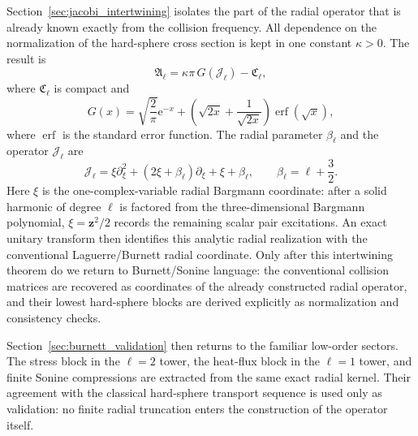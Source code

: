 \documentclass[11pt]{article}
\numberwithin{equation}{section}
\newcommand{\e}{\mathrm e}
\theoremstyle{definition}
\begin{document}
Section~\ref{sec:jacobi_intertwining} isolates the part of the radial operator that is already known
exactly from the collision frequency.  All dependence on the normalization
of the hard-sphere cross section is kept in one constant $\kappa>0$.  The
result is
\begin{equation}
 \boxed{
 \mathfrak A_\ell
 =
 \kappa\pi\,G(\mathcal J_\ell)-\mathfrak C_\ell,
 }
 \label{eq:intro_main_operator}
\end{equation}
where $\mathfrak C_\ell$ is compact and
\begin{equation}
 G(x)
 =
 \sqrt{\frac2\pi}\e^{-x}
 +
 \left(\sqrt{2x}+\frac1{\sqrt{2x}}\right)\operatorname{erf}(\sqrt x),
 \label{eq:intro_G}
\end{equation}
where $\operatorname{erf}$ is the standard error function.  The radial
parameter $\beta_\ell$ and the operator $\mathcal J_\ell$ are
\begin{equation}
 \mathcal J_\ell
 =
 \xi\partial_\xi^2
 +(2\xi+\beta_\ell)\partial_\xi
 +\xi+\beta_\ell,
 \qquad
 \beta_\ell=\ell+\frac32.
 \label{eq:intro_J}
\end{equation}
Here $\xi$ is the one-complex-variable radial Bargmann coordinate: after a
solid harmonic of degree $\ell$ is factored from the three-dimensional Bargmann
polynomial, $\xi=\bm z^2/2$ records the remaining scalar pair excitations.
An exact unitary transform then identifies this analytic radial realization
with the conventional Laguerre/Burnett radial coordinate.  Only after this
intertwining theorem do we return to Burnett/Sonine language: the conventional
collision matrices are recovered as coordinates of the already constructed
radial operator, and their lowest hard-sphere blocks are derived explicitly as
normalization and consistency checks.

Section~\ref{sec:burnett_validation} then returns to the familiar low-order
sectors.  The stress block in the $\ell=2$ tower, the heat-flux block in the
$\ell=1$ tower, and finite Sonine compressions are extracted from the same
exact radial kernel.  Their agreement with the classical hard-sphere
transport sequence is used only as validation: no finite radial truncation
enters the construction of the operator itself.
\end{document}
